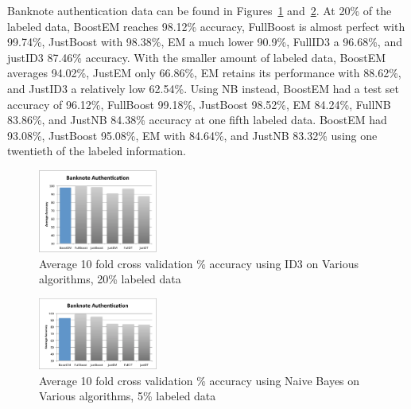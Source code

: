 \documentclass{sig-alternate}
\begin{document}
Banknote authentication data can be found in Figures~\ref{bankAcc} and~\ref{bankAcc5}. At 20\% of the labeled data, BoostEM reaches 98.12\% accuracy, FullBoost is almost perfect with 99.74\%, JustBoost with 98.38\%, EM a much lower 90.9\%, FullID3 a 96.68\%, and justID3 87.46\% accuracy.  With the smaller amount of labeled data, BoostEM averages 94.02\%, JustEM only 66.86\%, EM retains its performance with 88.62\%, and JustID3 a relatively low 62.54\%.
Using NB instead, BoostEM had a test set accuracy of 96.12\%, FullBoost 99.18\%, JustBoost 98.52\%, EM 84.24\%, FullNB 83.86\%, and JustNB 84.38\% accuracy at one fifth labeled data. BoostEM had 93.08\%, JustBoost 95.08\%, EM with 84.64\%, and JustNB 83.32\% using one twentieth of the labeled information.
\begin{figure}[ht!]
\centering
\includegraphics[width=0.35\textwidth]{figures/bankAcc.pdf}
\caption{Average 10 fold cross validation \% accuracy using ID3 on Various algorithms, 20\% labeled data}
\label{bankAcc}
\end{figure}
\begin{figure}
\centering
\includegraphics[width=0.35\textwidth]{figures/bankAcc5.pdf}
\caption{Average 10 fold cross validation \% accuracy using Naive Bayes on Various algorithms, 5\% labeled data}
\label{bankAcc5}
\end{figure}
\end{document}
